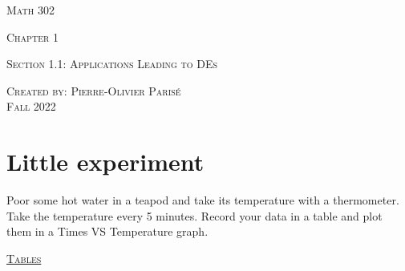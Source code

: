 \documentclass[12pt,a4paper]{article}
\newcounter{example}[section]
\begin{document}
\thispagestyle{empty}

\begin{center}
\vspace*{2.5cm}

{\Huge \textsc{Math 302}}

\vspace*{2cm}

{\LARGE \textsc{Chapter 1}} 

\vspace*{0.75cm}

\noindent\textsc{Section 1.1: Applications Leading to DEs}

\vspace*{0.75cm}

\tableofcontents

\vfill

\noindent \textsc{Created by: Pierre-Olivier Paris{\'e}} \\
\textsc{Fall 2022}
\end{center}

\newpage

\section{Little experiment}

\begin{example}
Poor some hot water in a teapod and take its temperature with a thermometer. Take the temperature every 5 minutes. Record your data in a table and plot them in a Times VS Temperature graph. \end{example}

\underline{\textsc{Tables}}
\end{document}
